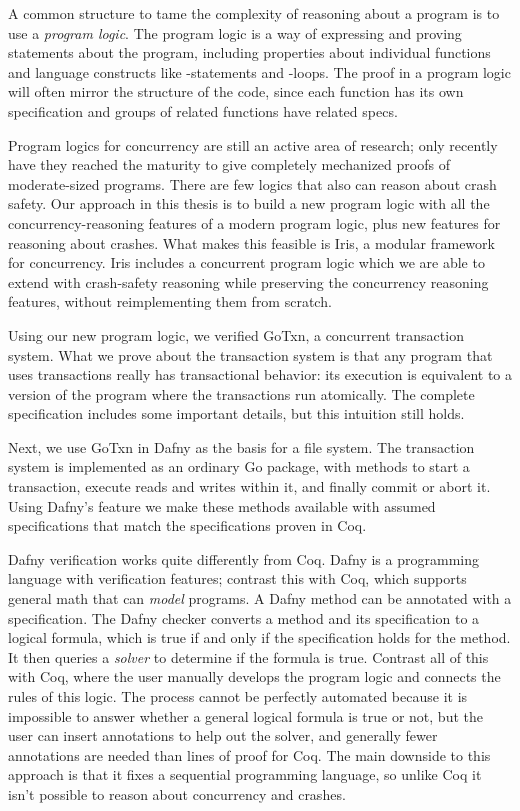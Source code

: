 A common structure to tame the complexity of reasoning about a program is to use
a \emph{program logic}. The program logic is a way of expressing and proving
statements about the program, including properties about individual functions
and language constructs like -statements and -loops. The proof
in a program logic will often mirror the structure of the code, since each
function has its own specification and groups of related functions have related
specs.

Program logics for concurrency are still an active area of research; only
recently have they reached the maturity to give completely mechanized proofs of
moderate-sized programs. There are few logics that also can reason about crash
safety. Our approach in this thesis is to build a new program logic with all the
concurrency-reasoning features of a modern program logic, plus new features for
reasoning about crashes. What makes this feasible is Iris, a modular framework
for concurrency. Iris includes a concurrent program logic which we are able to
extend with crash-safety reasoning while preserving the concurrency reasoning
features, without reimplementing them from scratch.

Using our new program logic, we verified GoTxn, a concurrent transaction system.
What we prove about the transaction system is that any program that uses
transactions really has transactional behavior: its execution is equivalent to a
version of the program where the transactions run atomically. The complete
specification includes some important details, but this intuition still holds.

Next, we use GoTxn in Dafny as the basis for a file system.
The transaction system is implemented as an ordinary Go package, with methods to
start a transaction, execute reads and writes within it, and finally commit or
abort it. Using Dafny's  feature we make these methods available with
assumed specifications that match the specifications proven in Coq.

Dafny verification works quite differently from Coq. Dafny is a programming
language with verification features; contrast this with Coq, which supports
general math that can \emph{model} programs. A Dafny method can be annotated
with a specification. The Dafny checker converts a method and its specification
to a logical formula, which is true if and only if the specification holds for
the method. It then queries a \emph{solver} to determine if the formula is true.
Contrast all of this with Coq, where the user manually develops the program
logic and connects the rules of this logic. The process cannot be perfectly
automated because it is impossible to answer whether a general logical formula
is true or not, but the user can insert annotations to help out the solver, and
generally fewer annotations are needed than lines of proof for Coq. The main
downside to this approach is that it fixes a sequential programming language, so
unlike Coq it isn't possible to reason about concurrency and crashes.

